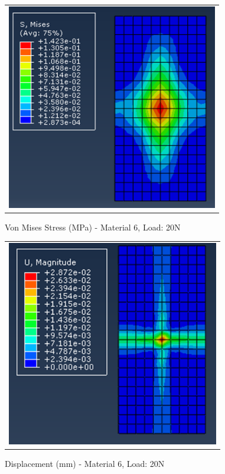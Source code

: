 \documentclass[a4paper,12pt]{article}
\numberwithin{equation}{section}
\numberwithin{figure}{section}
\begin{document}
\begin{figure}[H]
  \centering
  \begin{tabular}{@{}c@{}}
    \includegraphics[width=0.7\linewidth,height=255pt]{Results/Point Loading/M6_VMS_L4_new.png} \\
  \end{tabular}
  \caption{Von Mises Stress (MPa) - Material 6, Load: 20N}
\end{figure}

\begin{figure}[H]
  \centering
  \begin{tabular}{@{}c@{}}
    \includegraphics[width=0.7\linewidth,height=255pt]{Results/Point Loading/M6_DIS_L4_new.png} \\
  \end{tabular}
  \caption{Displacement (mm) - Material 6, Load: 20N}
\end{figure}
\end{document}
